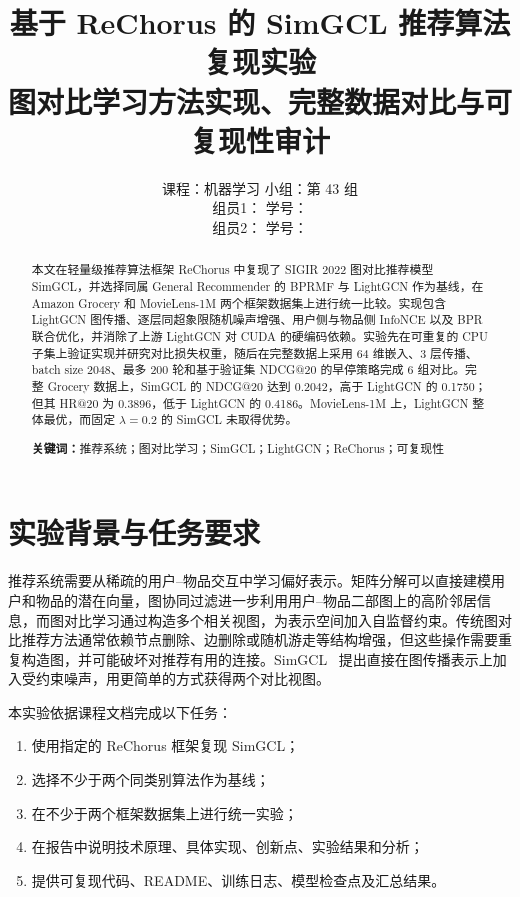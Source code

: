 \documentclass[UTF8,a4paper,12pt]{ctexart}
\title{\bfseries 基于 ReChorus 的 SimGCL 推荐算法复现实验\\
\large 图对比学习方法实现、完整数据对比与可复现性审计}
\author{
  课程：机器学习 \quad 小组：第 43 组 \\[0.5em]
  组员1：\underline{\makebox[3.5cm][c]{鲁越}} \quad 学号：\underline{\makebox[3.5cm][c]{24334089}} \\[0.5em]
  组员2：\underline{\makebox[3.5cm][c]{何天佑}} \quad 学号：\underline{\makebox[3.5cm][c]{24334040}}
}
\begin{document}
\pagestyle{plain}

\maketitle

\begin{abstract}
\normalsize
{}
本文在轻量级推荐算法框架 ReChorus 中复现了 SIGIR 2022 图对比推荐模型 SimGCL，并选择同属 General Recommender 的 BPRMF 与 LightGCN 作为基线，在 Amazon Grocery 和 MovieLens-1M 两个框架数据集上进行统一比较。实现包含 LightGCN 图传播、逐层同超象限随机噪声增强、用户侧与物品侧 InfoNCE 以及 BPR 联合优化，并消除了上游 LightGCN 对 CUDA 的硬编码依赖。实验先在可重复的 CPU 子集上验证实现并研究对比损失权重，随后在完整数据上采用 64 维嵌入、3 层传播、batch size 2048、最多 200 轮和基于验证集 NDCG@20 的早停策略完成 6 组对比。完整 Grocery 数据上，SimGCL 的 NDCG@20 达到 0.2042，高于 LightGCN 的 0.1750；但其 HR@20 为 0.3896，低于 LightGCN 的 0.4186。MovieLens-1M 上，LightGCN 整体最优，而固定 $\lambda=0.2$ 的 SimGCL 未取得优势。

\noindent\textbf{关键词：}推荐系统；图对比学习；SimGCL；LightGCN；ReChorus；可复现性
\end{abstract}

\tableofcontents
\clearpage

\section{实验背景与任务要求}

推荐系统需要从稀疏的用户--物品交互中学习偏好表示。矩阵分解可以直接建模用户和物品的潜在向量，图协同过滤进一步利用用户--物品二部图上的高阶邻居信息，而图对比学习通过构造多个相关视图，为表示空间加入自监督约束。传统图对比推荐方法通常依赖节点删除、边删除或随机游走等结构增强，但这些操作需要重复构造图，并可能破坏对推荐有用的连接。SimGCL~\cite{simgcl} 提出直接在图传播表示上加入受约束噪声，用更简单的方式获得两个对比视图。

本实验依据课程文档完成以下任务：

\begin{enumerate}
  \item 使用指定的 ReChorus 框架复现 SimGCL；
  \item 选择不少于两个同类别算法作为基线；
  \item 在不少于两个框架数据集上进行统一实验；
  \item 在报告中说明技术原理、具体实现、创新点、实验结果和分析；
  \item 提供可复现代码、README、训练日志、模型检查点及汇总结果。
\end{enumerate}
\end{document}
